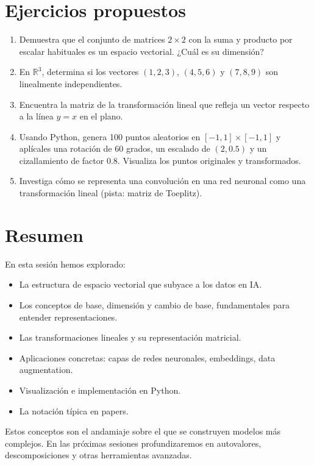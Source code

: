 \documentclass[12pt,a4paper,openany,oneside]{book}
\begin{document}
\section{Ejercicios propuestos}

\begin{enumerate}
    \item Demuestra que el conjunto de matrices $2\times2$ con la suma y producto por escalar habituales es un espacio vectorial. ¿Cuál es su dimensión?
    \item En $\mathbb{R}^3$, determina si los vectores $(1,2,3)$, $(4,5,6)$ y $(7,8,9)$ son linealmente independientes.
    \item Encuentra la matriz de la transformación lineal que refleja un vector respecto a la línea $y=x$ en el plano.
    \item Usando Python, genera 100 puntos aleatorios en $[-1,1]\times[-1,1]$ y aplícales una rotación de 60 grados, un escalado de $(2,0.5)$ y un cizallamiento de factor 0.8. Visualiza los puntos originales y transformados.
    \item Investiga cómo se representa una convolución en una red neuronal como una transformación lineal (pista: matriz de Toeplitz).
\end{enumerate}

\section{Resumen}

En esta sesión hemos explorado:
\begin{itemize}
    \item La estructura de espacio vectorial que subyace a los datos en IA.
    \item Los conceptos de base, dimensión y cambio de base, fundamentales para entender representaciones.
    \item Las transformaciones lineales y su representación matricial.
    \item Aplicaciones concretas: capas de redes neuronales, embeddings, data augmentation.
    \item Visualización e implementación en Python.
    \item La notación típica en papers.
\end{itemize}
Estos conceptos son el andamiaje sobre el que se construyen modelos más complejos. En las próximas sesiones profundizaremos en autovalores, descomposiciones y otras herramientas avanzadas.
\end{document}
